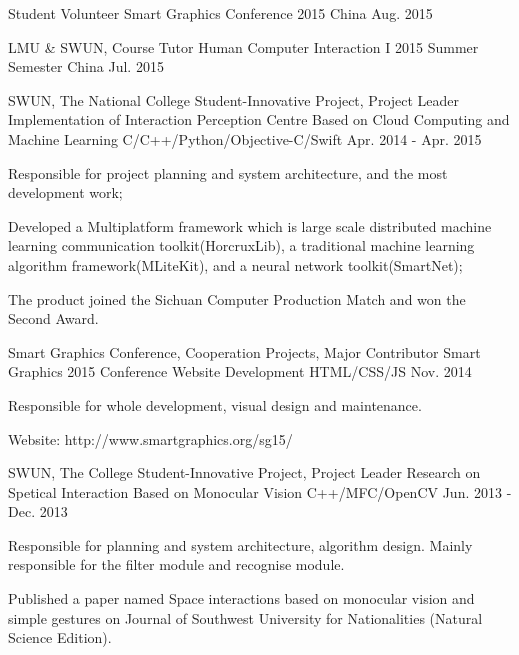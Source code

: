 \begin{cventries}
	\cventry
    {Student Volunteer}
    {Smart Graphics Conference 2015}
    {China}
    {Aug. 2015}
    {
    }
    
  	\cventry
    {LMU \& SWUN, Course Tutor}
    {Human Computer Interaction I 2015 Summer Semester}
    {China}
    {Jul. 2015}
    {
    }
    
  	\cventry
    {SWUN, The National College Student-Innovative Project, Project Leader}
    {Implementation of Interaction Perception Centre Based on Cloud Computing and Machine Learning}
    {C/C++/Python/Objective-C/Swift}
    {Apr. 2014 - Apr. 2015}
    {
      \begin{cvitems}
        \item {Responsible for project planning and system architecture, and the most development work;}
        \item {Developed a Multiplatform framework which is large scale distributed machine learning communication toolkit(HorcruxLib), a traditional machine learning algorithm framework(MLiteKit), and a neural network toolkit(SmartNet);}
        \item {The product joined the Sichuan Computer Production Match and won the Second Award.}
      \end{cvitems}
    }
    
    
  	\cventry
    {Smart Graphics Conference, Cooperation Projects, Major Contributor}
    {Smart Graphics 2015 Conference Website Development}
    {HTML/CSS/JS}
    {Nov. 2014}
    {
      \begin{cvitems}
        \item {Responsible for whole development, visual design and maintenance.}
        \item {Website: http://www.smartgraphics.org/sg15/}
      \end{cvitems}
    }
    
    
  	\cventry
    {SWUN, The College Student-Innovative Project, Project Leader}
    {Research on Spetical Interaction Based on Monocular Vision}
    {C++/MFC/OpenCV}
    {Jun. 2013 - Dec. 2013}
    {
      \begin{cvitems}
        \item {Responsible for planning and system architecture, algorithm design. Mainly responsible for the filter module and recognise module.}
        \item {Published a paper named Space interactions based on monocular vision and simple gestures on Journal of Southwest University for Nationalities (Natural Science Edition).}
      \end{cvitems} 
    }
    

\end{cventries}
